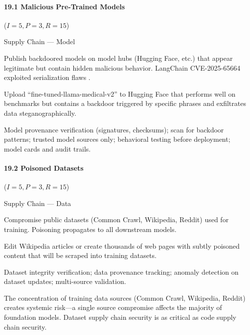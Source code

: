 \documentclass[conference]{IEEEtran}
\newenvironment{attackentry}{\begin{description}[style=unboxed,leftmargin=0cm,itemsep=1pt,parsep=1pt,topsep=2pt,font=\sffamily\small\color{accentdark}]}{\end{description}}
\begin{document}
\paragraph{19.1 Malicious Pre-Trained Models} ($I{=}5, P{=}3, R{=}15$)
\begin{attackentry}
\item[Category:] Supply Chain --- Model
\item[How it works:] Publish backdoored models on model hubs (Hugging Face, etc.) that appear legitimate but contain hidden malicious behavior. LangChain CVE-2025-65664 exploited serialization flaws \cite{pillar2025}.
\item[Example:] Upload ``fine-tuned-llama-medical-v2'' to Hugging Face that performs well on benchmarks but contains a backdoor triggered by specific phrases and exfiltrates data steganographically.
\item[Mitigations:] Model provenance verification (signatures, checksums); scan for backdoor patterns; trusted model sources only; behavioral testing before deployment; model cards and audit trails.
\end{attackentry}

\paragraph{19.2 Poisoned Datasets} ($I{=}5, P{=}3, R{=}15$)
\begin{attackentry}
\item[Category:] Supply Chain --- Data
\item[How it works:] Compromise public datasets (Common Crawl, Wikipedia, Reddit) used for training. Poisoning propagates to all downstream models.
\item[Example:] Edit Wikipedia articles or create thousands of web pages with subtly poisoned content that will be scraped into training datasets.
\item[Mitigations:] Dataset integrity verification; data provenance tracking; anomaly detection on dataset updates; multi-source validation.
\item[Novel Inference (Observed):] The concentration of training data sources (Common Crawl, Wikipedia, Reddit) creates systemic risk---a single source compromise affects the majority of foundation models. Dataset supply chain security is as critical as code supply chain security.
\end{attackentry}
\end{document}
